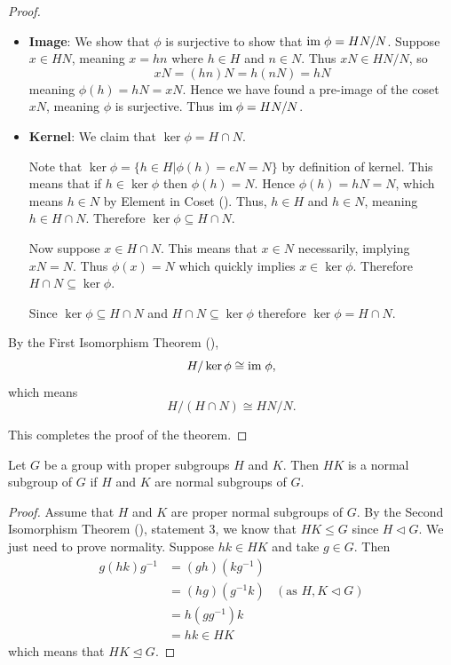 \begin{proof}
\begin{enumerate}
\begin{itemize}
            \item \textbf{Image}: We show that $\phi$ is surjective to show that $\mathrm{im}\;\phi = HN/N$. Suppose $x \in HN$, meaning $x = hn$ where $h \in H$ and $n \in N$. Thus $xN \in HN/N$, so
            \[
                xN = (hn)N = h(nN) = hN
            \]
            meaning $\phi(h) = hN = xN$. Hence we have found a pre-image of the coset $xN$, meaning $\phi$ is surjective. Thus $\mathrm{im}\; \phi = HN/N$.

            \item \textbf{Kernel}: We claim that $\ker\phi = H \cap N$.

            Note that $\ker\phi = \{h \in H \vert \phi(h) = eN = N\}$ by definition of kernel. This means that if $h \in \ker\phi$ then $\phi(h) = N$. Hence $\phi(h) = hN = N$, which means $h \in N$ by Element in Coset (). Thus, $h \in H$ and $h \in N$, meaning $h \in H \cap N$. Therefore $\ker \phi \subseteq H \cap N$.

            Now suppose $x \in H \cap N$. This means that $x \in N$ necessarily, implying $xN = N$. Thus $\phi(x) = N$ which quickly implies $x \in \ker\phi$. Therefore $H \cap N \subseteq \ker\phi$.

            Since $\ker \phi \subseteq H \cap N$ and  $H \cap N \subseteq \ker\phi$ therefore $\ker\phi = H\cap N$.
        \end{itemize}

        By the First Isomorphism Theorem (),
        \[
            H / \ker\phi \cong \mathrm{im}\; \phi,
        \]
        which means
        \[
            H/(H\cap N) \cong HN/N.
        \]
    \end{enumerate}
    This completes the proof of the theorem.
\end{proof}

\begin{corollary}\label{corollary-subgroup-product-is-normal-subgroup-if-subgroups-are-normal}
    Let $G$ be a group with proper subgroups $H$ and $K$. Then $HK$ is a normal subgroup of $G$ if $H$ and $K$ are normal subgroups of $G$.
\end{corollary}
\begin{proof}
    Assume that $H$ and $K$ are proper normal subgroups of $G$. By the Second Isomorphism Theorem (), statement 3, we know that $HK \leq G$ since $H \lhd G$. We just need to prove normality. Suppose $hk \in HK$ and take $g \in G$. Then
    \begin{align*}
        g(hk)g^{-1} &= (gh)(kg^{-1})\\
        &= (hg)(g^{-1}k) & (\text{as } H, K \lhd G)\\
        &= h(gg^{-1})k\\
        &= hk \in HK
    \end{align*}
    which means that $HK \unlhd G$.
\end{proof}


